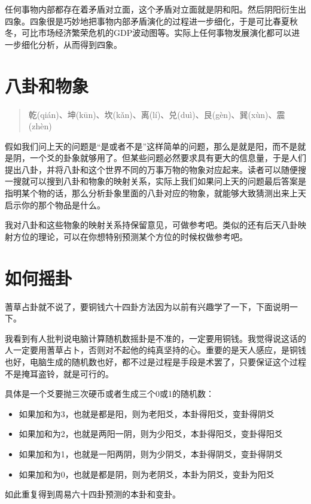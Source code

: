 \documentclass[12pt,oneside]{book}
\begin{document}
任何事物内部都存在着矛盾对立面，这个矛盾对立面就是阴和阳。然后阴阳衍生出四象。四象很是巧妙地把事物内部矛盾演化的过程进一步细化，于是可比春夏秋冬，可比市场经济繁荣危机的GDP波动图等。实际上任何事物发展演化都可以进一步细化分析，从而得到四象。

\section{八卦和物象}
\begin{quote}
乾(qián)、坤(kūn)、坎(kǎn)、离(lí)、兑(duì)、艮(gèn)、巽(xùn)、震(zhèn)
\end{quote}


假如我们问上天的问题是“是或者不是”这样简单的问题，那么是就是阳，而不是就是阴，一个爻的卦象就够用了。但某些问题必然要求具有更大的信息量，于是人们提出八卦，并将八卦和这个世界不同的万事万物的物象对应起来。读者可以随便搜一搜就可以搜到八卦和物象的映射关系，实际上我们如果问上天的问题最后答案是指明某个物的话，那么分析卦象里面的八卦对应的物象，就能够大致猜测出来上天启示你的那个物品是什么。

我对八卦和这些物象的映射关系持保留意见，可做参考吧。类似的还有后天八卦映射方位的理论，可以在你想特别预测某个方位的时候权做参考吧。

\section{如何摇卦}
蓍草占卦就不说了，要铜钱六十四卦方法因为以前有兴趣学了一下，下面说明一下。

我看到有人批判说电脑计算随机数摇卦是不准的，一定要用铜钱。我觉得说这话的人一定要用蓍草占卜，否则对不起他的纯真坚持的心。重要的是天人感应，是铜钱也好，电脑生成的随机数也好，都不过是过程是手段是术罢了，只要保证这个过程不是掩耳盗铃，就是可行的。

具体是一个爻要抛三次硬币或者生成三个0或1的随机数：

\begin{itemize}
\item 如果加和为3，也就是都是阳，则为老阳爻，本卦得阳爻，变卦得阴爻
\item 如果加和为2，也就是两阳一阴，则为少阳爻，本卦得阳爻，变卦得阳爻
\item 如果加和为1，也就是一阳两阴，则为少阴爻，本卦得阴爻，变卦得阴爻
\item 如果加和为0，也就是都是阴，则为老阴爻，本卦为阴爻，变卦为阳爻
\end{itemize}


如此重复得到周易六十四卦预测的本卦和变卦。
\end{document}
